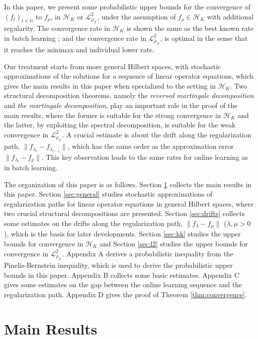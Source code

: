 \documentclass[twoside,11pt]{amsart}
\theoremstyle{theorem}
\theoremstyle{definition}
\theoremstyle{remark}
\def\L{{\mathscr L}}
\def\L2{{\mathscr L}^2_{\rho_\X}}
\def\H{{\mathscr H}}
\def\X{{\mathscr X}}
\def\N{{\mathbb N}}
\def\la{\lambda}
\begin{document}
In this paper, we present some probabilistic upper bounds for the convergence of $(f_t)_{t\in \N}$ to $f_\rho$, in $\H_K$ or $\L2$, 
under the assumption of $f_\rho\in \H_K$ with additional regularity. The convergence rate in $\H_K$ is shown the same as the best known rate 
in batch learning \cite{SmaZho-ShannonIII}; and the convergence rate in $\L2$, is optimal in the sense that it reaches the minimax and individual 
lower rate.

Our treatment starts from more general Hilbert spaces, with stochastic approximations of the solutions for a sequence of linear operator equations, which
gives the main results in this paper when specialized to the setting in $\H_K$. Two structural decomposition theorems, namely the \emph{reversed martingale 
decomposition} and \emph{the martingale decomposition}, play an important role in the proof of the main results, where the former is suitable for the 
strong convergence in $\H_K$ and the latter, by exploiting the spectral decomposition, is suitable for the weak convergence in $\L2$. A crucial estimate 
is about the drift along the regularization path, $\|f_{\la_t}-f_{\la_{t-1}}\|$, 
which has the same order as the approximation error $\|f_{\la_t}- f_\rho\|$. This key observation leads to the same
rates for online learning as in batch learning. 

The organization of this paper is as follows. Section \ref{sec:main} collects the main results in this paper. Section \ref{sec:general} studies
stochastic approximations of regularization paths for linear operator equations in general Hilbert spaces, where two crucial structural decompositions
are presented. Section \ref{sec:drifts} collects some estimates on the drifts along the regularization path, 
$\|f_{\la} - f_{\mu}\|$ ($\la,\mu>0$), which is the basis for later developments.
Section \ref{sec:hk} studies the upper bounds for convergence in $\H_K$ and
Section \ref{sec:l2} studies the upper bounds for convergence in $\L2$. Appendix A derives
a probabilistic inequality from the Pinelis-Bernstein inequality, which is used to derive the probabilistic upper bounds in this paper. 
Appendix B collects some basic estimates. Appendix C gives some estimates on the gap between the online learning sequence and the regularization path.
Appendix D gives the proof of Theorem \ref{thm:convergence}.  

\section{Main Results} \label{sec:main}
\end{document}
